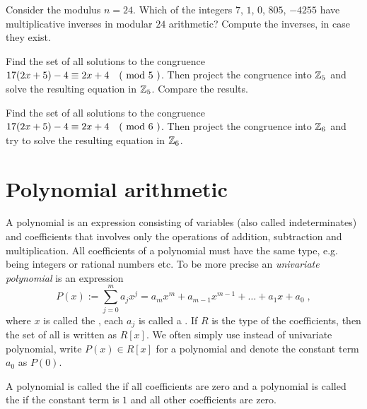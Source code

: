 \begin{exercise}
Consider the modulus $n=24$. Which of the integers $7$, $1$, $0$, $805$, $-4255$ have multiplicative inverses in modular $24$ arithmetic? Compute the inverses, in case they exist.
\end{exercise}
\begin{exercise}
Find the set of all solutions to the congruence $17(2x+5)-4 \equiv 2x+4 \quad \text{( mod } 5 \text{ )}$. Then project the congruence into $\mathbb{Z}_5$ and solve the resulting equation in $\mathbb{Z}_5$. Compare the results.
\end{exercise}
\begin{exercise}
Find the set of all solutions to the congruence $17(2x+5)-4 \equiv 2x+4 \quad \text{( mod } 6 \text{ )}$. Then project the congruence into $\mathbb{Z}_6$ and try to solve the resulting equation in $\mathbb{Z}_6$.
\end{exercise}
\section{Polynomial arithmetic}
\label{sec:polynomial_arithmetics}
A polynomial is an expression consisting of variables (also called indeterminates) and coefficients that involves only the operations of addition, subtraction and multiplication. All coefficients of a polynomial must have the same type, e.g. being integers or rational numbers etc. To be more precise an \textit{univariate polynomial} is an expression
\begin{equation}
P(x) := \sum _{j = 0} ^{m}{a} _{j}{x} ^{j} ={a} _{m}x^m +{a} _{m-1} x^{m-1} + \dots + a_1 x + a_0 \;,
\end{equation}
where $x$ is called the , each $ a_j$ is called a . If $R$ is the type of the coefficients, then the set of all  is written as $R[x]$. We often simply use  instead of univariate polynomial, write $ P (x) \in R[x]$ for a polynomial and denote the constant term $a_0$ as $ P(0)$.

A polynomial is called the  if all coefficients are zero and a polynomial is called the  if the constant term is $1$ and all other coefficients are zero.

